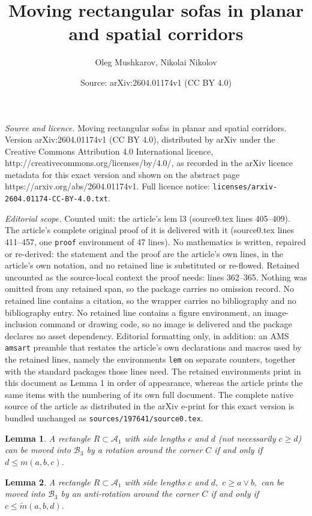\documentclass[10pt,a4paper]{amsart}
\title{Moving rectangular sofas in planar and spatial corridors}
\author{Oleg Mushkarov, Nikolai Nikolov}
\date{Source: arXiv:2604.01174v1 (CC BY 4.0)}
\newtheorem{lem}{Lemma}
\def\A{\mathcal A}
\def\B{\mathcal B}
\def\ss{\subset}
\begin{document}
\maketitle

\noindent\emph{Source and licence.} Moving rectangular sofas in planar and spatial corridors. Version arXiv:2604.01174v1 (CC BY 4.0), distributed by arXiv under the Creative Commons Attribution 4.0 International licence, http://creativecommons.org/licenses/by/4.0/, as recorded in the arXiv licence metadata for this exact version and shown on the abstract page https://arxiv.org/abs/2604.01174v1. Full licence notice: \texttt{licenses/arxiv-2604.01174-CC-BY-4.0.txt}.\par\smallskip

\noindent\textit{Editorial scope.} Counted unit: the article's lem l3 (source0.tex lines 405--409). The article's complete original proof of it is delivered with it (source0.tex lines 411--457, one \texttt{proof} environment of 47 lines). No mathematics is written, repaired or re-derived: the statement and the proof are the article's own lines, in the article's own notation, and no retained line is substituted or re-flowed.  Retained uncounted as the source-local context the proof needs: lines 362--365.  Nothing was omitted from any retained span, so the package carries no omission record.  No retained line contains a citation, so the wrapper carries no bibliography and no bibliography entry.  No retained line contains a figure environment, an image-inclusion command or drawing code, so no image is delivered and the package declares no asset dependency.  Editorial formatting only, in addition: an AMS \texttt{amsart} preamble that restates the article's own declarations and macros used by the retained lines, namely the environments \texttt{lem} on separate counters, together with the standard packages those lines need.  The retained environments print in this document as Lemma 1 in order of appearance, whereas the article prints the same items with the numbering of its own full document.  The complete native source of the article as distributed in the arXiv e-print for this exact version is bundled unchanged as \texttt{sources/197641/source0.tex}.
\begin{lem}\label{l2} A rectangle $R\ss \A_1$ with side lengths
$c$ and $d$ (not necessarily $c\ge d$) can be moved into $\B_3$ by
a rotation around the corner $C$ if and only if $d\le m(a,b,c).$
\end{lem}

\begin{lem}\label{l3} A rectangle $R\ss \A_1$ with side lengths
$c$ and $d,$ $c\ge a\vee b,$ can be moved into $\B_3$ by an
anti-rotation around the corner $C$ if and only if $c\le
\widetilde{m}(a,b,d).$
\end{lem}
\end{document}
